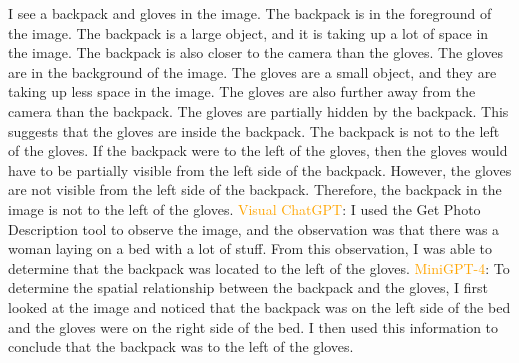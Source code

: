 \begin{enumerate}
    I see a backpack and gloves in the image.
    The backpack is in the foreground of the image. The backpack is a large object, and it is taking up a lot of space in the image. The backpack is also closer to the camera than the gloves.
    The gloves are in the background of the image. The gloves are a small object, and they are taking up less space in the image. The gloves are also further away from the camera than the backpack.
    The gloves are partially hidden by the backpack. This suggests that the gloves are inside the backpack.
    The backpack is not to the left of the gloves. If the backpack were to the left of the gloves, then the gloves would have to be partially visible from the left side of the backpack. However, the gloves are not visible from the left side of the backpack.
    Therefore, the backpack in the image is not to the left of the gloves.
    \subitem \textcolor{orange}{Visual ChatGPT}: I used the Get Photo Description tool to observe the image, and the observation was that there was a woman laying on a bed with a lot of stuff. From this observation, I was able to determine that the backpack was located to the left of the gloves.
    \subitem \textcolor{orange}{MiniGPT-4}: To determine the spatial relationship between the backpack and the gloves, I first looked at the image and noticed that the backpack was on the left side of the bed and the gloves were on the right side of the bed. I then used this information to conclude that the backpack was to the left of the gloves.
\end{enumerate}
